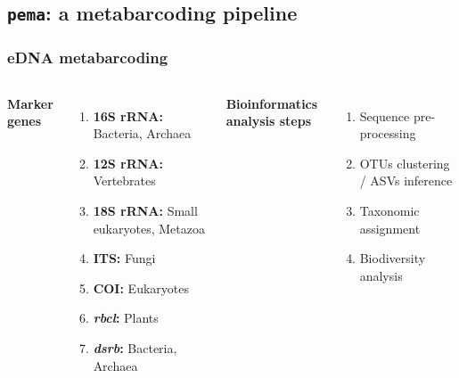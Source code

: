 \documentclass{beamer}
\begin{document}
   \begin{frame}
      \subsection{\texttt{pema}: a metabarcoding pipeline}
      \frametitle{eDNA metabarcoding}
      \begin{singlespace}


         \begin{columns}[onlytextwidth]


               \textbf{Marker genes} \\ 

               \begin{enumerate}
                  \item \textbf{16S rRNA:} Bacteria, Archaea
                  \item \textbf{12S rRNA:} Vertebrates
                  \item \textbf{18S rRNA:} Small eukaryotes, Metazoa
                  \item \textbf{ITS:} Fungi
                  \item \textbf{COI:} Eukaryotes
                  \item \textbf{\textit{rbcl}:} Plants
                  \item \textbf{\textit{dsrb}:} Bacteria, Archaea
               \end{enumerate}


               \textbf{Bioinformatics analysis steps}

               \begin{enumerate}
                  \item Sequence pre-processing
                  \item OTUs clustering / ASVs inference
                  \item Taxonomic assignment
                  \item Biodiversity analysis
               \end{enumerate}
         
         \end{columns}

      \end{singlespace}
   \end{frame}
\end{document}
